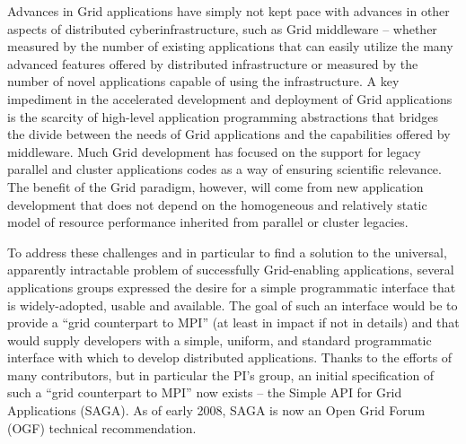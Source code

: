 \documentclass[a4paper,10pt]{article}
\begin{document}
Advances in Grid applications have simply not kept pace with advances in other aspects of distributed cyberinfrastructure, such as Grid middleware -- whether measured by the number of existing applications that can easily utilize the many advanced features offered by distributed infrastructure or measured by the number of novel applications capable of using the infrastructure. A key impediment in the accelerated development and deployment of Grid applications is the scarcity of high-level application programming abstractions that bridges the divide between the needs of Grid applications and the capabilities offered by middleware.  Much Grid development has focused on the support for legacy parallel and cluster applications codes as a way of ensuring scientific relevance.  The benefit of the Grid paradigm, however, will come from new application development that does not depend on the homogeneous and relatively static model of resource performance inherited from parallel or cluster legacies.  %

To address these challenges and in particular to find a solution to the universal, apparently intractable problem of successfully Grid-enabling applications, several applications groups expressed the desire for a simple programmatic interface that is widely-adopted, usable and available.  The goal of such an interface would be to provide a ``grid counterpart to MPI'' (at least in impact if not in details) and that would supply developers with a simple, uniform, and standard programmatic interface with which to develop distributed applications.  Thanks to the efforts of many contributors, but in particular the PI's group, an initial specification of such a ``grid counterpart to MPI'' now exists -- the Simple API for Grid Applications (SAGA). As of early 2008, SAGA is now an Open Grid Forum (OGF) technical recommendation.


\end{document}
